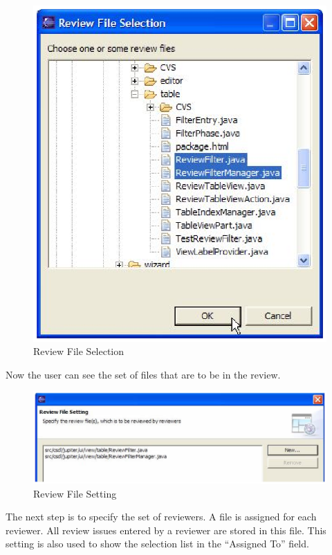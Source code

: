 \begin{figure}[htbp]
  \centering
  \includegraphics{images/fig3-4.eps}
  \caption{Review File Selection}
  \label{fig3-4}
\end{figure}
 
Now the user can see the set of files that are to be in the review.

\begin{figure}[htbp]
  \centering
  \includegraphics{images/fig3-5.eps}
  \caption{Review File Setting}
  \label{fig3-5}
\end{figure}
 
The next step is to specify the set of reviewers. A file is assigned for each reviewer. All review issues entered by a reviewer are stored in this file. This setting is also used to show the selection list in the ``Assigned To'' field.

